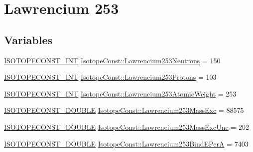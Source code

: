 \hypertarget{group___isotope_const-_lawrencium-_lr253}{}\section{Lawrencium 253}
\label{group___isotope_const-_lawrencium-_lr253}
\subsection*{Variables}
\begin{DoxyCompactItemize}
\item 
\mbox{\hyperlink{group___isotope_const-_macros_ga5f18360b3e99483a35c32d789e62621c}{I\+S\+O\+T\+O\+P\+E\+C\+O\+N\+S\+T\+\_\+\+I\+NT}} \mbox{\hyperlink{group___isotope_const-_lawrencium-_lr253_ga976743f94e1436a5c440c9a54892891a}{Isotope\+Const\+::\+Lawrencium253\+Neutrons}} = 150
\item 
\mbox{\hyperlink{group___isotope_const-_macros_ga5f18360b3e99483a35c32d789e62621c}{I\+S\+O\+T\+O\+P\+E\+C\+O\+N\+S\+T\+\_\+\+I\+NT}} \mbox{\hyperlink{group___isotope_const-_lawrencium-_lr253_ga38feb17a228e35901b6d4e6baf7b0ab3}{Isotope\+Const\+::\+Lawrencium253\+Protons}} = 103
\item 
\mbox{\hyperlink{group___isotope_const-_macros_ga5f18360b3e99483a35c32d789e62621c}{I\+S\+O\+T\+O\+P\+E\+C\+O\+N\+S\+T\+\_\+\+I\+NT}} \mbox{\hyperlink{group___isotope_const-_lawrencium-_lr253_gaa88dc41ab6a39d122237b2501baa1881}{Isotope\+Const\+::\+Lawrencium253\+Atomic\+Weight}} = 253
\item 
\mbox{\hyperlink{group___isotope_const-_macros_ga8f45a7272ce02c0b4c65c44636ed719a}{I\+S\+O\+T\+O\+P\+E\+C\+O\+N\+S\+T\+\_\+\+D\+O\+U\+B\+LE}} \mbox{\hyperlink{group___isotope_const-_lawrencium-_lr253_ga697ae19fc2cd4be966ef749eb2630ae0}{Isotope\+Const\+::\+Lawrencium253\+Mass\+Exc}} = 88575
\item 
\mbox{\hyperlink{group___isotope_const-_macros_ga8f45a7272ce02c0b4c65c44636ed719a}{I\+S\+O\+T\+O\+P\+E\+C\+O\+N\+S\+T\+\_\+\+D\+O\+U\+B\+LE}} \mbox{\hyperlink{group___isotope_const-_lawrencium-_lr253_ga2b04d0f4853e31b6727389675d4e47d9}{Isotope\+Const\+::\+Lawrencium253\+Mass\+Exc\+Unc}} = 202
\item 
\mbox{\hyperlink{group___isotope_const-_macros_ga8f45a7272ce02c0b4c65c44636ed719a}{I\+S\+O\+T\+O\+P\+E\+C\+O\+N\+S\+T\+\_\+\+D\+O\+U\+B\+LE}} \mbox{\hyperlink{group___isotope_const-_lawrencium-_lr253_gad47f56107e7951ae9b3c2acc10168daf}{Isotope\+Const\+::\+Lawrencium253\+Bind\+E\+PerA}} = 7403
\item 

\end{DoxyCompactItemize}
